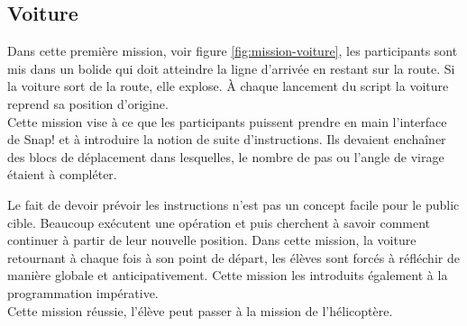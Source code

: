 % 

\subsection{Voiture}
\label{mission-voiture}
Dans cette première mission, voir figure \ref{fig:mission-voiture}, les participants sont mis dans un bolide qui doit atteindre la ligne d'arrivée en restant sur la route. Si la voiture sort de la route, elle explose. À chaque lancement du script la voiture reprend sa position d'origine.\\

Cette mission vise à ce que les participants puissent prendre en main l'interface de Snap! et à introduire la notion de suite d'instructions. Ils devaient enchaîner des blocs de déplacement dans lesquelles, le nombre de pas ou l'angle de virage étaient à compléter.

Le fait de devoir prévoir les instructions n'est pas un concept facile pour le public cible. Beaucoup exécutent une opération et puis cherchent à savoir comment continuer à partir de leur nouvelle position. Dans cette mission, la voiture retournant à chaque fois à son point de départ, les élèves sont forcés à réfléchir de manière globale et anticipativement. Cette mission les introduits également à la programmation impérative.\\ 

Cette mission réussie, l'élève peut passer à la mission de l'hélicoptère.

